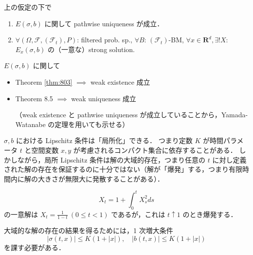 \documentclass{jsarticle}
\begin{document}
\setcounter{thm}{2}

\begin{screen}
    \begin{thm}\label{thm:803}
        上の仮定の下で
        \begin{enumerate}[label=(\roman*)]
            \item
            $E(\sigma, b)$ に関して pathwise uniqueness が成立．
            \item
            $\forall (\Omega, \mathcal{F}, (\mathcal{F}_t), P)$: filtered prob. sp., $\forall B$: $(\mathcal{F}_t)$-BM, $\forall x\in\mathbf{R}^d, \exists! X$: $E_x(\sigma, b)$ の（一意な）strong solution.
        \end{enumerate}
    \end{thm}
\end{screen}

$E(\sigma, b)$ に関して 
\begin{itemize}
    \item 
    Theorem \ref{thm:803}
    $\implies $ weak existence 成立
    \item
    Theorem 8.5
    $\implies $ weak uniqueness 成立
    
    （weak existence と pathwise uniqueness が成立していることから，Yamada-Watanabe の定理を用いても示せる）
\end{itemize}

\begin{remark*}
    $\sigma, b$ における Lipschitz 条件は「局所化」できる．
    つまり定数 $K$ が時間パラメータ $t$ と空間変数 $x, y$ が考慮されるコンパクト集合に依存することがある．
    しかしながら，局所 Lipschitz 条件は解の大域的存在，つまり任意の $t$ に対し定義された解の存在を保証するのに十分ではない（解が「爆発」する，つまり有限時間内に解の大きさが無限大に発散することがある）．

    \begin{ex*}
        $$
        X_t
        = 1+\int_0^t X_s^2 ds
        $$
        の一意解は $X_t=\frac{1}{1-t}\ (0\le t<1)$ であるが，これは $t\uparrow1$ のとき爆発する．
    \end{ex*}
    
    大域的な解の存在の結果を得るためには，1 次増大条件
    $$
    \left\lvert \sigma(t, x)\right\rvert\le K(1+\left\lvert x\right\rvert), \quad
    \left\lvert b(t, x)\right\rvert\le K(1+\left\lvert x\right\rvert)
    $$
    を課す必要がある．
\end{remark*}
\end{document}
